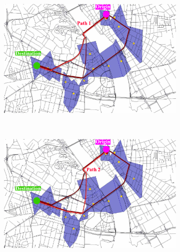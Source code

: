 \begin{figure}
	\centering
	\begin{subfigure}[b]{0.5\linewidth}
		\includegraphics[width=\textwidth]{./images/tattipath0}
		\caption{}
		\label{fig:tattipath0}
	\end{subfigure}%
	~
	\begin{subfigure}[b]{0.5\linewidth}
		\includegraphics[width=\textwidth]{./images/tattipath1}
		\caption{}
		\label{fig:tattipath1}
	\end{subfigure}


\end{figure}
